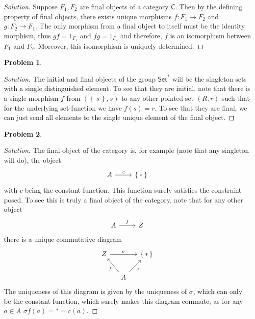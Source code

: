 \documentclass{article}
\theoremstyle{definition}
\newtheorem{problem-internal}{Problem}[subsection]
\newenvironment{problem}{
	\medskip
	\begin{problem-internal}
	}{
\end{problem-internal}
}
\newenvironment{solution}{
	\begin{proof}[Solution]
		\vspace{-8px}
		\setlength{\parskip}{4px}
		\setlength{\parindent}{0px}
	}{
\end{proof}
}
\newcommand{\set}[1]{\left\{\,#1\,\right\}}
\newcommand{\C}{\mathsf{C}}
\newcommand{\Cset}{\mathsf{Set}}
\begin{document}
\begin{solution}
	Suppose $F_1, F_2$ are final objects of a category $\C$. Then by the defining property of final objects, there exists unique morphisms $f: F_1 \to F_2$ and $g: F_2 \to F_1$. The only morphism from a final object to itself must be the identity morphism, thus $gf = 1_{F_1}$ and $fg = 1_{F_2}$ and therefore, $f$ is an isomorphism between $F_1$ and $F_2$. Moreover, this isomorphism is uniquely determined.
\end{solution}

\begin{problem}
\end{problem}

\begin{solution}
	The initial and final objects of the group $\Cset^*$ will be the singleton sets with a single distinguished element. To see that they are initial, note that there is a single morphism $f$ from $(\set{s}, s)$ to any other pointed set $(R, r)$ such that for the underlying set-function we have $f(s)=r$. To see that they are final, we can just send all elements to the single unique element of the final object.
\end{solution}

\begin{problem}
\end{problem}

\begin{solution}
	The final object of the category is, for example (note that any singleton will do), the object
	\begin{equation*}
		\begin{tikzcd}
			A \arrow[r, "c"] & \set{*}
		\end{tikzcd}
	\end{equation*}
	with $c$ being the constant function. This function surely satisfies the constraint posed. To see this is truly a final object of the category, note that for any other object
	\begin{equation*}
		\begin{tikzcd}
			A \arrow[r, "f"] & Z
		\end{tikzcd}
	\end{equation*}
	there is a unique commutative diagram
	\begin{equation*}
		\begin{tikzcd}[column sep=small]
			Z \arrow[rr, "\sigma"] & & \set{*} \\
			& A \arrow[ul, "f"] \arrow[ur, "c" swap] &
		\end{tikzcd}
	\end{equation*}
	The uniqueness of this diagram is given by the uniqueness of $\sigma$, which can only be the constant function, which surely makes this diagram commute, as for any $a \in A$ $\sigma f(a) = * = c(a)$.
\end{solution}
\end{document}
